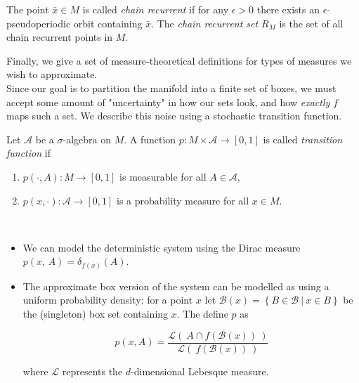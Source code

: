 \begin{definition}
    \cite*{dynbook} The point $\bar{x} \in M$ is called \emph{chain recurrent} if for any 
    $\epsilon > 0$ there exists an $\epsilon$-pseudoperiodic orbit containing $\bar{x}$. 
    The \emph{chain recurrent set} $R_M$ is the set of all chain recurrent points in $M$.
\end{definition}

Finally, we give a set of measure-theoretical definitions for types of measures we wish to 
approximate. \\

Since our goal is to partition the manifold into a finite set of boxes, we must accept some
amount of "uncertainty" in how our sets look, and how \emph{exactly} $f$ maps such a set.
We describe this noise using a stochastic transition function. 

\begin{definition}
    \cite*{attr} Let $\mathcal{A}$ be a $\sigma$-algebra on $M$. A function 
    $p : M \times \mathcal{A} \to [0,1]$ is called \emph{transition function} if

    \begin{enumerate}
        \item $p(\cdot, A) : M \to [0,1]$ is measurable for all $A \in \mathcal{A}$,
        \item $p(x, \cdot) : \mathcal{A} \to [0,1]$ is a probability measure for all $x \in M$.
    \end{enumerate}

\end{definition}

\begin{example}\
    
    \begin{itemize}
        \item\label{ex:q} \cite*{attr} We can model the deterministic system using the Dirac 
        measure $p(x,\, A) = \delta_{f(x)}(A)$. 
        \item The approximate box version of the system can be modelled as using a uniform 
        probability density: for a point $x$ let 
        $\mathcal{B}(x) = \left\{ B \in \mathcal{B}\ \vert\ x \in B \right\}$ be the 
        (singleton) box set containing $x$. The define $p$ as 

        \begin{equation}
            p(x, A) = \frac{
                \mathcal{L} (\ A \cap f(\mathcal{B}(x))\ )
            }{
                \mathcal{L} (\ f(\mathcal{B}(x))\ )
            }
        \end{equation}

        where $\mathcal{L}$ represents the $d$-dimensional Lebesque measure.
    
    \end{itemize}

\end{example}

